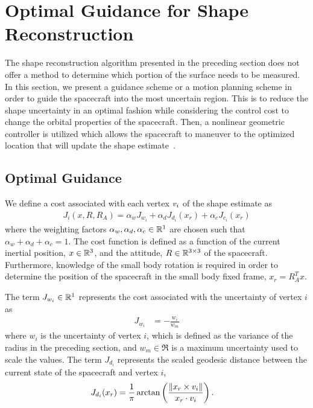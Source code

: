 \documentclass[journal]{new-aiaa}
\begin{document}
\section{Optimal Guidance for Shape Reconstruction}\label{sec:explore_asteroid}

The shape reconstruction algorithm presented in the preceding section does not offer a method to determine which portion of the surface needs to be measured. 
In this section, we present a guidance scheme or a motion planning scheme in order to guide the spacecraft into the most uncertain region. 
This is to reduce the shape uncertainty in an optimal fashion while considering the control cost to change the orbital properties of the spacecraft. 
Then, a nonlinear geometric controller is utilized which allows the spacecraft to maneuver to the optimized location that will update the shape estimate~\cite{kulumani2017b}.

\subsection{Optimal Guidance}

We define a cost associated with each vertex \( v_i \) of the shape estimate as
\begin{align}\label{eq:explore_cost}
    J_i (x, R, R_A) = \alpha_w J_{w_i} + \alpha_d J_{d_i}(x_r) + \alpha_c J_{c_i}(x_r)
\end{align}
where the weighting factors \( \alpha_w, \alpha_d, \alpha_c \in \mathbb{R}^1 \) are chosen such that \( \alpha_w + \alpha_d + \alpha_c = 1 \).
The cost function is defined as a function of the current inertial position, \( x \in \mathbb{R}^3 \), and the attitude, \( R \in \mathbb{R}^{3\times3}\) of the spacecraft.
Furthermore, knowledge of the small body rotation is required in order to determine the position of the spacecraft in the small body fixed frame, \( x_r = R_A^T x\).

The term \( J_{w_i} \in \mathbb{R}^1 \) represents the cost associated with the uncertainty of vertex \( i \) as
\begin{align}\label{eq:weight_cost}
    J_{w_i} &= - \frac{w_i}{w_m}
\end{align}
where \( w_i \) is the uncertainty of vertex \( i \), which is defined as the variance of the radius in the preceding section, and \( w_m \in\Re \) is a maximum uncertainty used to scale the values.
The term \( J_{d_i} \) represents the scaled geodesic distance between the current state of the spacecraft and vertex \( i \),
\begin{align}\label{eq:distance_cost}
    J_{d_i}(x_r) &= \frac{1}{\pi} \arctan \left(  \frac{\left\| x_r \times v_i \right\|}{x_r \cdot v_i} \right).
\end{align}
\end{document}
